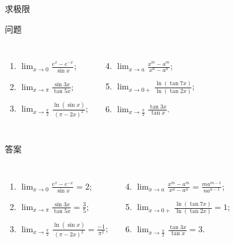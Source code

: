 \documentclass[
10pt,
aspectratio=43,
]{beamer}
\begin{document}
\begin{frame}[fragile]{求极限}
	\begin{block}{问题}
		\begin{columns}[onlytextwidth]
			\begin{enumerate}
				\item $\displaystyle\lim _{x \rightarrow 0} \frac{e^x-e^{-x}}{\sin x}$;
				\item $\displaystyle\lim _{x \rightarrow \pi } \frac{\sin 3 x}{\tan 5 x}$;
				\item $\displaystyle\lim _{x \rightarrow \frac{\pi}{2}} \frac{\ln (\sin x)}{(\pi-2 x)^2}$;
			\end{enumerate}
			\begin{enumerate} \setcounter{enumi}{3}
				\item $\displaystyle\lim _{x \rightarrow a} \frac{x^m-a^m}{x^n-a^n}$;
				\item $\displaystyle\lim _{x \rightarrow 0+} \frac{\ln (\tan 7 x)}{\ln (\tan 2 x)}$;
				\item $\displaystyle\lim _{x \rightarrow \frac{\pi}{2}} \frac{\tan 3 x}{\tan x}$.
			\end{enumerate}
		\end{columns}
	\end{block}

	\pause

	\begin{exampleblock}{答案}
		\begin{columns}[onlytextwidth]
			\begin{enumerate}
				\item $\displaystyle\lim _{x \rightarrow 0} \frac{e^x-e^{-x}}{\sin x} = 2$; \pause
				\item $\displaystyle\lim _{x \rightarrow \pi } \frac{\sin 3 x}{\tan 5 x} = \frac{3}{5}$; \pause
				\item $\displaystyle\lim _{x \rightarrow \frac{\pi}{2}} \frac{\ln (\sin x)}{(\pi-2 x)^2} = \frac{-1}{\pi^2}$; \pause
			\end{enumerate}
			\begin{enumerate} \setcounter{enumi}{3}
				\item $\displaystyle\lim _{x \rightarrow a} \frac{x^m-a^m}{x^n-a^n} = \frac{m a^{m-1}}{n a^{n-1}}$; \pause
				\item $\displaystyle\lim _{x \rightarrow 0+} \frac{\ln (\tan 7 x)}{\ln (\tan 2 x)} = 1$; \pause
				\item $\displaystyle\lim _{x \rightarrow \frac{\pi}{2}} \frac{\tan 3 x}{\tan x} = 3.$
			\end{enumerate}
		\end{columns}
	\end{exampleblock}
\end{frame}
\end{document}
